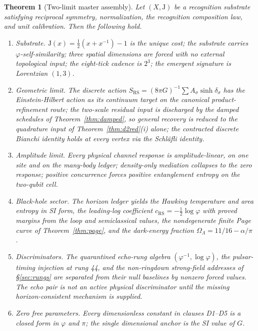 \documentclass[11pt,letterpaper]{article}
\newtheorem{theorem}{Theorem}[section]
\theoremstyle{definition}
\newcommand{\J}{\mathrm{J}}
\newcommand{\phiG}{\varphi}
\newcommand{\RS}{\mathrm{RS}}
\newcommand{\half}{\tfrac{1}{2}}
\begin{document}
\begin{theorem}[Two-limit master assembly]\label{thm:master}
Let $(X,\J)$ be a recognition substrate satisfying reciprocal
symmetry, normalization, the recognition composition law, and unit
calibration.  Then the following hold.
\begin{enumerate}[label=\textup{(D\arabic*)},leftmargin=2.6em]
\item \emph{Substrate.}  $\J(x)=\half(x+x^{-1})-1$ is the unique cost;
the substrate carries $\phiG$-self-similarity; three spatial
dimensions are forced with no external topological input; the
eight-tick cadence is $2^3$; the emergent signature is Lorentzian
$(1,3)$.
\item \emph{Geometric limit.}  The discrete action
$S_\RS=(8\pi G)^{-1}\sum A_\sigma\sinh\delta_\sigma$ has the
Einstein-Hilbert action as its continuum target on the canonical
product-refinement route; the two-scale residual input is discharged
by the damped schedules of Theorem~\ref{thm:damped}, so general
recovery is reduced to the quadrature input of
Theorem~\ref{thm:d2red}(i) alone; the contracted discrete Bianchi
identity holds at every vertex via the Schl\"afli identity.
\item \emph{Amplitude limit.}  Every physical channel response is
amplitude-linear, on one site and on the many-body ledger; density-only
mediation collapses to the zero response; positive concurrence forces
positive entanglement entropy on the two-qubit cell.
\item \emph{Black-hole sector.}  The horizon ledger yields the Hawking
temperature and area entropy in SI form, the leading-log coefficient
$c_\RS=-\half\log\phiG$ with proved margins from the loop and
semiclassical values, the nondegenerate finite Page curve of
Theorem~\ref{thm:page}, and the dark-energy fraction
$\Omega_\Lambda=11/16-\alpha/\pi$.
\item \emph{Discriminators.}  The quarantined echo-rung algebra
$(\phiG^{-1},\log\phiG)$, the pulsar-timing injection at rung 44, and
the non-ringdown strong-field addresses of \S\ref{sec:rungs} are
separated from their null baselines by nonzero forced values.  The
echo pair is not an active physical discriminator until the missing
horizon-consistent mechanism is supplied.
\item \emph{Zero free parameters.}  Every dimensionless constant in
clauses D1--D5 is a closed form in $\phiG$ and $\pi$; the single
dimensional anchor is the SI value of $G$.
\end{enumerate}
\end{theorem}
\end{document}
